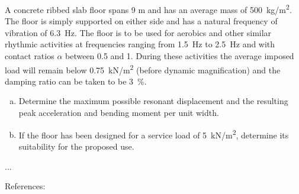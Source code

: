 
\begin{Exercise}[label={footfall_analysis}]
A concrete ribbed slab floor spans 9 m and has an average mass of \qty{500}{kg/m^2}. The floor is simply supported on either side and has a natural frequency of vibration of \qty{6.3}{Hz}. The floor is to be used for aerobics and other similar rhythmic activities at frequencies ranging from \qty{1.5}{Hz} to \qty{2.5}{Hz} and with contact ratios $\alpha$ between 0.5 and 1. During these activities the average imposed load will remain below \qty{0.75}{kN/m^2} (before dynamic magnification) and the damping ratio can be taken to be \qty{3}{\%}.

\begin{enumerate}[(a)]
    \item Determine the maximum possible resonant displacement and the resulting peak acceleration and bending moment per unit width.
    \item If the floor has been designed for a service load of \qty{5}{kN/m^2}, determine its suitability for the proposed use.
\end{enumerate}

\begin{center}
\hspace{1em}
\end{center}

\shortAnswer ...

References: \cite[page ??]{chopra}
\end{Exercise}



